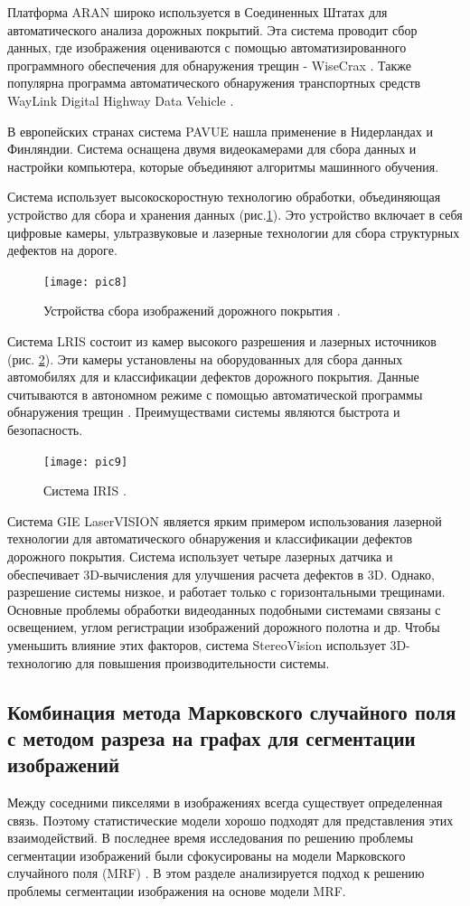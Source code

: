 \documentclass[a4paper,14pt]{extreport}
\begin{document}
Платформа ARAN \cite{h97} широко используется в Соединенных Штатах для автоматического анализа дорожных покрытий. Эта система проводит сбор данных, где изображения оцениваются с помощью автоматизированного программного обеспечения для обнаружения трещин - WiseCrax \cite{h19}. Также популярна программа автоматического обнаружения транспортных средств WayLink Digital Highway Data Vehicle \cite{h98}.

В европейских странах система PAVUE \cite{h99} нашла применение в Нидерландах и Финляндии. Система оснащена двумя видеокамерами для сбора данных и настройки компьютера, которые объединяют алгоритмы машинного обучения.

Система использует высокоскоростную технологию обработки, объединяющая устройство для сбора и хранения данных (рис.\ref{pic8}). Это устройство включает в себя цифровые камеры, ультразвуковые и лазерные технологии для сбора структурных дефектов на дороге.
\begin{figure}[ht!]
\centering
\texttt{[image: pic8]}
\caption{Устройства сбора изображений дорожного покрытия \cite{h109}.}
	\label{pic8}
	\end{figure}
	
Система LRIS состоит из камер высокого разрешения и лазерных источников (рис. \ref{pic9}). Эти камеры установлены на оборудованных для сбора данных автомобилях для и классификации дефектов дорожного покрытия. Данные считываются в автономном режиме с помощью автоматической программы обнаружения трещин \cite{h16}. Преимуществами системы являются быстрота и безопасность.
\begin{figure}[ht!]
\centering
\texttt{[image: pic9]}
\caption{Система IRIS \cite{h16}.}
	\label{pic9}
	\end{figure}
	
Система GIE LaserVISION \cite{h100} является ярким примером использования лазерной технологии для автоматического обнаружения и классификации дефектов дорожного покрытия. Система использует четыре лазерных датчика и обеспечивает 3D-вычисления для улучшения расчета дефектов в 3D. Однако, разрешение системы низкое, и работает только с горизонтальными трещинами. Основные проблемы обработки видеоданных подобными системами связаны с освещением, углом регистрации изображений дорожного полотна и др. Чтобы уменьшить влияние этих факторов, система StereoVision \cite{h101, h106, h107} использует 3D-технологию для повышения производительности системы.
\subsection{Комбинация метода Марковского случайного поля с методом разреза на графах для сегментации изображений}
Между соседними пикселями в изображениях всегда существует определенная связь. Поэтому статистические модели хорошо подходят для представления этих взаимодействий. В последнее время исследования по решению проблемы сегментации изображений были сфокусированы на модели Марковского случайного поля (MRF) \cite{h111, h112}. В этом разделе анализируется подход к решению проблемы сегментации изображения на основе модели MRF.
\end{document}

